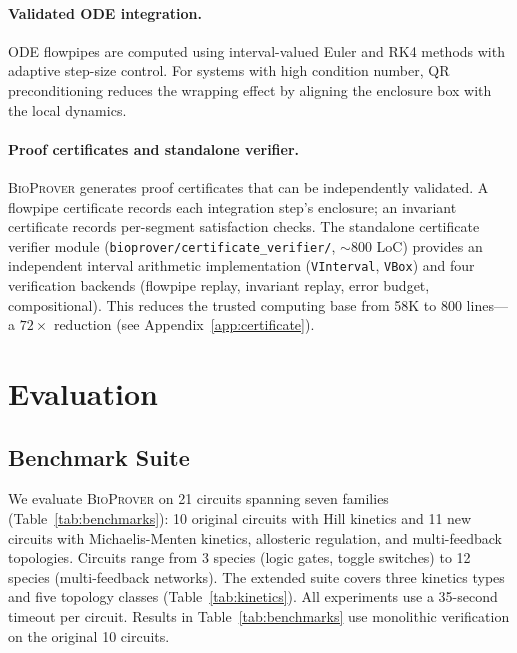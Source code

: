 \documentclass[11pt]{article}
\newcommand{\bioprover}{\textsc{BioProver}}
\begin{document}
\paragraph{Validated ODE integration.}
ODE flowpipes are computed using interval-valued Euler and RK4
methods with adaptive step-size control. For systems with high
condition number, QR preconditioning reduces the wrapping effect by
aligning the enclosure box with the local dynamics.

\paragraph{Proof certificates and standalone verifier.}
\bioprover{} generates proof certificates that can be independently
validated. A flowpipe certificate records each integration step's
enclosure; an invariant certificate records per-segment satisfaction
checks. The standalone certificate verifier module
(\texttt{bioprover/certificate\_verifier/}, $\sim$800 LoC) provides
an independent interval arithmetic implementation (\texttt{VInterval},
\texttt{VBox}) and four verification backends (flowpipe replay,
invariant replay, error budget, compositional). This reduces the
trusted computing base from 58K to 800 lines---a $72\times$ reduction
(see Appendix~\ref{app:certificate}).

\section{Evaluation}
\label{sec:evaluation}

\subsection{Benchmark Suite}

We evaluate \bioprover{} on 21 circuits spanning seven families
(Table~\ref{tab:benchmarks}): 10 original circuits with Hill
kinetics and 11 new circuits with Michaelis-Menten kinetics,
allosteric regulation, and multi-feedback topologies. Circuits
range from 3 species (logic gates, toggle switches) to 12 species
(multi-feedback networks). The extended suite covers three kinetics
types and five topology classes (Table~\ref{tab:kinetics}).
All experiments use a 35-second timeout per circuit. Results in
Table~\ref{tab:benchmarks} use monolithic verification on the
original 10 circuits.
\end{document}
